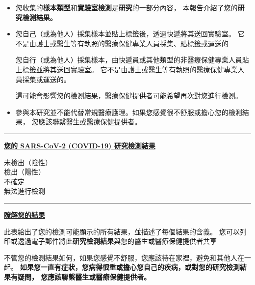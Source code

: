 \documentclass[10pt]{article}
\newcommand{\PageLine}{\rule{\textwidth}{0.25mm}}
\begin{document}
\begin{itemize}
\item

  您收集的\textbf{樣本類型}和\textbf{實驗室檢測}是\textbf{研究}的一部分內容，
  本報告介紹了您的\textbf{研究檢測結果。}

\item
  您自己（或為他人）採集樣本並貼上標籤後，透過快遞將其送回實驗室。
  它不是由護士或醫生等有執照的醫療保健專業人員採集、貼標籤或運送的

  您自行（或為他人）採集樣本，由快遞員或其他類型的非醫療保健專業人員貼上標籤並將其送回實驗室。
  它不是由護士或醫生等有執照的醫療保健專業人員採集或運送的。



  這可能會影響您的檢測結果，醫療保健提供者可能希望再次對您進行檢測。

\item

  參與本研究並不能代替常規醫療護理。如果您感覺很不舒服或擔心您的檢測結果，
  您應該聯繫醫生或醫療保健提供者。

\end{itemize}

\bigskip
\PageLine

\large \underline{\textbf{您的 SARS-CoV-2 (COVID-19) 研究檢測結果}}

未檢出（陰性）\\
檢出（陽性）\\
不確定\\
無法進行檢測\\

\PageLine
\bigskip

\large \underline{\textbf{瞭解您的結果}}

此表給出了您的檢測可能顯示的所有結果，並描述了每個結果的含義。
您可以列印或透過電子郵件將此\textbf{研究檢測結果}與您的醫生或醫療保健提供者共享

不管您的檢測結果如何，如果您感覺不舒服，您應該待在家裡，避免和其他人在一起。
\textbf{如果您一直有症狀，您病得很重或擔心您自己的疾病，或對您的研究檢測結果有疑問，
您應該聯繫醫生或醫療保健提供者。}
\end{document}
